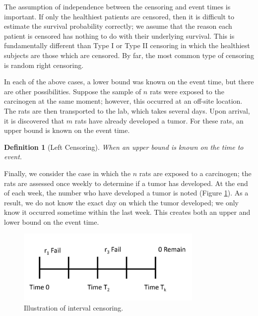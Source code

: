 \documentclass[
]{book}
\theoremstyle{plain}
\theoremstyle{mydefn}
\newtheorem{definition}{Definition}[chapter]
\theoremstyle{myexmpl}
\theoremstyle{remark}
\begin{document}
The assumption of independence between the censoring and event times is important. If only the healthiest patients are censored, then it is difficult to estimate the survival probability correctly; we assume that the reason each patient is censored has nothing to do with their underlying survival. This is fundamentally different than Type I or Type II censoring in which the healthiest subjects are those which are censored. By far, the most common type of censoring is random right censoring.

In each of the above cases, a lower bound was known on the event time, but there are other possibilities. Suppose the sample of \(n\) rats were exposed to the carcinogen at the same moment; however, this occurred at an off-site location. The rats are then transported to the lab, which takes several days. Upon arrival, it is discovered that \(m\) rats have already developed a tumor. For these rats, an upper bound is known on the event time.

\begin{definition}[Left Censoring]
When an \emph{upper} bound is known on the time to event.
\end{definition}

Finally, we consider the case in which the \(n\) rats are exposed to a carcinogen; the rats are assessed once weekly to determine if a tumor has developed. At the end of each week, the number who have developed a tumor is noted (Figure \ref{fig:surv-interval-censoring}). As a result, we do not know the exact day on which the tumor developed; we only know it occurred sometime within the last week. This creates both an upper and lower bound on the event time.

\begin{figure}

{\centering \includegraphics[width=0.8\textwidth]{images/censoring-interval} 

}

\caption{Illustration of interval censoring.}\label{fig:surv-interval-censoring}
\end{figure}
\end{document}
